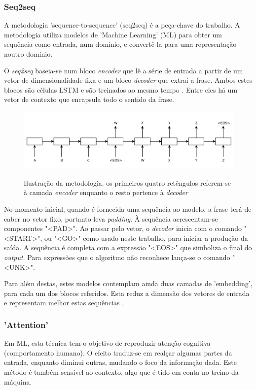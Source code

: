 \documentclass{article}
\begin{document}
\subsubsection{Seq2seq}
A metodologia 'sequence-to-sequence' (seq2seq) é a peça-chave do trabalho. A metodologia utiliza modelos de 'Machine Learning' (ML) para obter um sequência como entrada, num domínio, e convertê-la para uma representação noutro domínio. 

O \textit{seq2seq} baseia-se num bloco \textit{encoder} que lê a série de entrada a partir de um vetor de dimensionalidade fixa e um bloco \textit{decoder} que extrai a frase. Ambos estes blocos são células LSTM e são treinados ao mesmo tempo \cite{sutskever2014sequence}. Entre eles há um vetor de contexto que encapsula todo o sentido da frase.

\begin{figure}[h]
    \centering
    \includegraphics[scale=0.3]{encoder_decoder.png}
    \caption{Ilustração da metodologia. os primeiros quatro retêngulos referem-se à camada \textit{encoder} enquanto o resto pertence à \textit{decoder}}
    \cite{sutskever2014sequence}
    \label{fig1}
\end{figure}


No momento inicial, quando é fornecida uma sequência ao modelo, a frase terá de caber no vetor fixo, portanto leva \textit{padding}. À sequência acrescentam-se componentes "\textless PAD\textgreater ". Ao passar pelo vetor, o \textit{decoder} inicia com o comando "\textless START\textgreater ", ou "\textless GO\textgreater " como usado neste trabalho, para iniciar a produção da saída. A sequência é completa com a expressão "\textless EOS\textgreater " que simboliza o final do \textit{output}. Para expressões que o algoritmo não reconhece lança-se o comando "\textless UNK\textgreater ".

Para além destas, estes modelos contemplam ainda duas camadas de 'embedding', para cada um dos blocos referidos. Esta reduz a dimensão dos vetores de entrada e representam melhor estas sequências \cite{li2018slim}. 

\subsubsection{'Attention'}
Em ML, esta técnica tem o objetivo de reproduzir atenção cognitiva (comportamento humano). O efeito traduz-se em realçar algumas partes da entrada, enquanto diminui outras, mudando o foco da informação dada. Este método é também sensível ao contexto, algo que é tido em conta no treino da máquina. 
\end{document}
